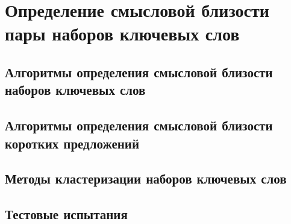 \chapter{Определение смысловой близости пары наборов ключевых слов} \label{chapt1}

\section{Алгоритмы определения смысловой близости наборов ключевых слов}
\section{Алгоритмы определения смысловой близости коротких предложений}
\section{Методы кластеризации наборов ключевых слов}
\section{Тестовые испытания}
